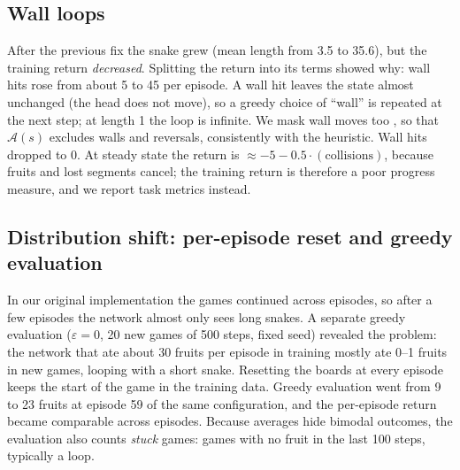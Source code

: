 \documentclass{article}
\begin{document}
\subsection{Wall loops}
\label{sec:walls}
After the previous fix the snake grew (mean length from 3.5 to 35.6), but the training return \emph{decreased}. Splitting the return into its terms showed why: wall hits rose from about 5 to 45 per episode.
A wall hit leaves the state almost unchanged (the head does not move), so a greedy choice of ``wall'' is repeated at the next step; at length 1 the loop is infinite.
We mask wall moves too \cite{huang2022}, so that $\mathcal{A}(s)$ excludes walls and reversals, consistently with the heuristic.
Wall hits dropped to 0. At steady state the return is $\approx -5 - 0.5\cdot(\text{collisions})$, because fruits and lost segments cancel; the training return is therefore a poor progress measure, and we report task metrics instead.

\subsection{Distribution shift: per-episode reset and greedy evaluation}
\label{sec:reset}
In our original implementation the games continued across episodes, so after a few episodes the network almost only sees long snakes.
A separate greedy evaluation ($\varepsilon=0$, 20 new games of 500 steps, fixed seed) revealed the problem: the network that ate about 30 fruits per episode in training mostly ate 0--1 fruits in new games, looping with a short snake.
Resetting the boards at every episode keeps the start of the game in the training data. Greedy evaluation went from 9 to 23 fruits at episode 59 of the same configuration, and the per-episode return became comparable across episodes.
Because averages hide bimodal outcomes, the evaluation also counts \emph{stuck} games: games with no fruit in the last 100 steps, typically a loop.
\end{document}
